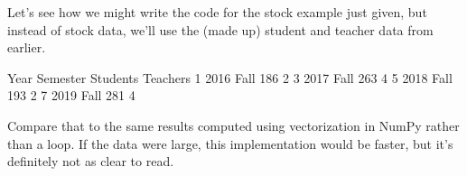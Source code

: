 \documentclass[letterpaper,10pt,english]{jupyterBook}
\begin{document}
\sphinxAtStartPar
Let’s see how we might write the code for the stock example just given, but instead of stock data, we’ll use the (made up) student and teacher data from earlier.

\begin{sphinxVerbatim}[commandchars=\\\{\}]
  \PYG{p}{[}\PYG{p}{]}

  \PYG{p}{[} \PYG{p}{]}
   \PYG{p}{[}\PYG{p}{]}
     \PYG{p}{[}\PYG{p}{]}  \PYG{p}{[}\PYG{p}{]}  \PYGZbs{}
       \PYG{p}{[}\PYG{p}{]}  \PYG{p}{[}\PYG{p}{]}
            

\PYG{p}{[}\PYG{p}{]}
\end{sphinxVerbatim}

\begin{sphinxVerbatim}[commandchars=\\\{\}]
   Year Semester  \PYGZsh{} Students  \PYGZsh{} Teachers
1  2016     Fall         186           2
3  2017     Fall         263           4
5  2018     Fall         193           2
7  2019     Fall         281           4
\end{sphinxVerbatim}

\sphinxAtStartPar
Compare that to the same results computed using vectorization in NumPy rather than a loop.  If the data were large, this implementation would be faster, but it’s definitely not as clear to read.
\end{document}
